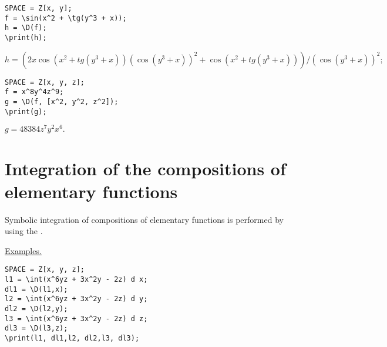 \begin{verbatim}
SPACE = Z[x, y];
f = \sin(x^2 + \tg(y^3 + x));
h = \D(f);
\print(h);
\end{verbatim}
\vspace*{-3mm}

{$ h = (2x\cos(x^2+tg(y^3+x))(\cos(y^3+x))^2+\cos(x^2+tg(y^3+x)))/(\cos(y^3+x))^2;$}

\begin{verbatim}
SPACE = Z[x, y, z];
f = x^8y^4z^9;
g = \D(f, [x^2, y^2, z^2]);
\print(g);
\end{verbatim}
\vspace*{-3mm}

{$g = 48384z^{7}y^{2}x^{6}. $ }

\section{Integration of the compositions of elementary functions}
Symbolic integration of compositions of elementary functions is performed by using the  
.
\smallskip

\underline{Examples. }

\begin{verbatim}
SPACE = Z[x, y, z];
l1 = \int(x^6yz + 3x^2y - 2z) d x;
dl1 = \D(l1,x);
l2 = \int(x^6yz + 3x^2y - 2z) d y;
dl2 = \D(l2,y);
l3 = \int(x^6yz + 3x^2y - 2z) d z;
dl3 = \D(l3,z);
\print(l1, dl1,l2, dl2,l3, dl3);
\end{verbatim}
\vspace*{-3mm}

